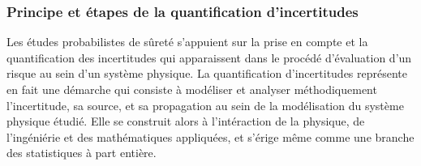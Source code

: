 \subsubsection{Principe et étapes de la quantification d'incertitudes}


Les études probabilistes de sûreté %
s'appuient sur la 
prise en compte et la quantification des incertitudes qui apparaissent dans le procédé d'évaluation d'un risque au sein d'un système physique.
%
La quantification d'incertitudes représente en fait une démarche qui consiste à modéliser et analyser méthodiquement l'incertitude, sa source, et sa propagation au sein de la modélisation du système physique étudié. %
Elle se construit alors à l'intéraction de la physique, de l'ingéniérie et des mathématiques appliquées, et s'érige même comme une branche des statistiques à part entière.

